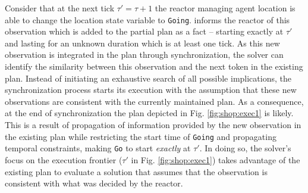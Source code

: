 Consider that at the next tick $\tau' = \tau+1$ the reactor managing
agent location is able to change the location state variable to
\texttt{Going}. \rx informs the reactor of this observation which is
added to the partial plan as a fact -- starting exactly at $\tau'$ and
lasting for an unknown duration which is at least one tick. As this
new observation is integrated in the plan through synchronization, the
solver can identify the similarity between this observation and the
next token in the existing plan. Instead of initiating an exhaustive
search of all possible implications, the synchronization process
starts its execution with the assumption that these new observations
are consistent with the currently maintained plan. As a consequence,
at the end of synchronization the plan depicted in Fig.
\ref{fig:shop:exec1} is likely. This is a result of propagation of
information provided by the new observation in the existing plan while
restricting the start time of \texttt{Going} and propagating temporal
constraints, making \texttt{Go} to start {\em exactly} at $\tau'$. In
doing so, the \eu solver's focus on the execution frontier ($\tau'$ in
Fig. \ref{fig:shop:exec1}) takes advantage of the existing plan to
evaluate a solution that assumes that the observation is consistent
with what was decided by the reactor.


